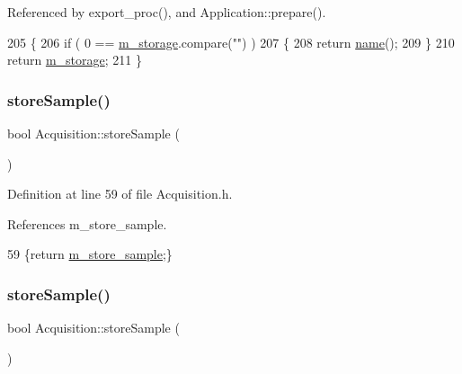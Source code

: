 Referenced by export\+\_\+proc(), and Application\+::prepare().


\begin{DoxyCode}
205                        \{
206     \textcolor{keywordflow}{if} ( 0 == \hyperlink{classProcessus_a132b1e71f72327e5a87f0a168c7b6325}{m\_storage}.compare(\textcolor{stringliteral}{""}) )
207     \{
208       \textcolor{keywordflow}{return} \hyperlink{classObject_a300f4c05dd468c7bb8b3c968868443c1}{name}();
209     \}
210     \textcolor{keywordflow}{return} \hyperlink{classProcessus_a132b1e71f72327e5a87f0a168c7b6325}{m\_storage};
211   \}
\end{DoxyCode}
\mbox{\label{classAcquisition_a9af304e0fb2076cd4f92703708efe83e}} 
\subsubsection{\texorpdfstring{store\+Sample()}{storeSample()}\hspace{0.1cm}{\footnotesize\ttfamily [1/2]}}
{\footnotesize\ttfamily bool Acquisition\+::store\+Sample (\begin{DoxyParamCaption}{ }\end{DoxyParamCaption})\hspace{0.3cm}{\ttfamily [inline]}}



Definition at line 59 of file Acquisition.\+h.



References m\+\_\+store\+\_\+sample.


\begin{DoxyCode}
59 \{\textcolor{keywordflow}{return} \hyperlink{classAcquisition_a987cc1d04007cf1f5acc1accfd0909e5}{m\_store\_sample};\}
\end{DoxyCode}
\mbox{\label{classAcquisition_a9af304e0fb2076cd4f92703708efe83e}} 
\subsubsection{\texorpdfstring{store\+Sample()}{storeSample()}\hspace{0.1cm}{\footnotesize\ttfamily [2/2]}}
{\footnotesize\ttfamily bool Acquisition\+::store\+Sample (\begin{DoxyParamCaption}{ }\end{DoxyParamCaption})\hspace{0.3cm}{\ttfamily [inline]}}



